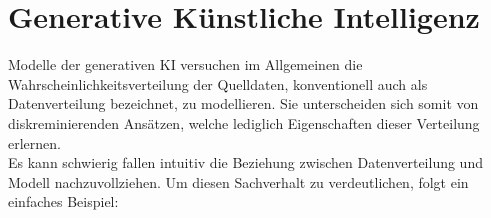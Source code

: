 
\section{Generative Künstliche Intelligenz}

Modelle der generativen \ac{KI} versuchen im Allgemeinen die Wahrscheinlichkeitsverteilung der Quelldaten, konventionell auch als Datenverteilung bezeichnet, zu modellieren. Sie unterscheiden sich somit von diskreminierenden Ansätzen, welche lediglich Eigenschaften dieser Verteilung erlernen. \\
Es kann schwierig fallen intuitiv die Beziehung zwischen Datenverteilung und Modell nachzuvollziehen. Um diesen Sachverhalt zu verdeutlichen, folgt ein einfaches Beispiel:

